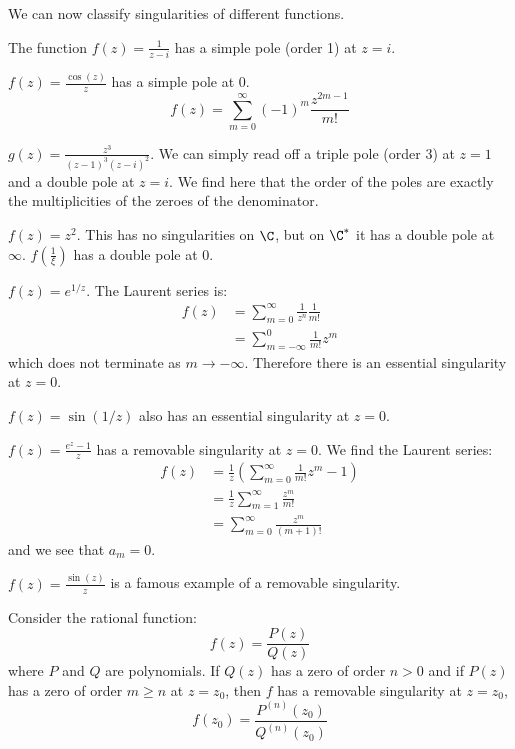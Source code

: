 \documentclass[../Main.tex]{subfiles}
\begin{document}
\begin{examples}{
        We can now classify singularities of different functions.
    }
    \item The function $f(z) = \frac{1}{z-i}$ has a simple pole (order 1) at $z = i$.
    \item $f(z) = \frac{\cos(z)}{z}$ has a simple pole at $0$.
        \begin{equation*}
            f(z) = \sum_{m=0}^{\infty} (-1)^m \frac{z^{2m-1}}{m!}
        \end{equation*}
    \item $g(z) = \frac{z^3}{(z-1)^3(z-i)^2}$. We can simply read off a triple pole (order 3) at $z = 1$ and a double pole at $z = i$. We find here that the order of the poles are exactly the multiplicities of the zeroes of the denominator.
    \item $f(z) = z^2$. This has no singularities on $\C$, but on $\Cstar$ it has a double pole at $\infty$. $f(\frac{1}{\xi})$ has a double pole at $0$.
    \item $f(z) = e^{1 / z}$. The Laurent series is:
        \begin{align*}
            f(z) &= \sum_{m=0}^{\infty} \frac{1}{z^n} \frac{1}{m!} \\
            &= \sum_{m=-\infty}^{0} \frac{1}{m!}z^m
        \end{align*}
        which does not terminate as $m \to -\infty$. Therefore there is an essential singularity at $z = 0$.
    \item $f(z) = \sin(1 / z)$ also has an essential singularity at $z = 0$.
    \item $f(z) = \frac{e^z - 1}{z}$ has a removable singularity at $z = 0$. We find the Laurent series:
        \begin{align*}
            f(z) &= \frac1z \left(\sum_{m=0}^{\infty} \frac{1}{m!} z^m - 1\right) \\
            &= \frac{1}{z} \sum_{m=1}^{\infty} \frac{z^m}{m!} \\
            &= \sum_{m=0}^{\infty} \frac{z^m}{(m+1)!}
        \end{align*}
        and we see that $a_m = 0$.
    \item $f(z) = \frac{\sin(z)}{z}$ is a famous example of a removable singularity.
    \item Consider the rational function:
        \begin{equation*}
            f(z) = \frac{P(z)}{Q(z)}
        \end{equation*}
        where $P$ and $Q$ are polynomials. If $Q(z)$ has a zero of order $n > 0$ and if $P(z)$ has a zero of order $m \geq n$ at $z = z_0$, then $f$ has a removable singularity at $z = z_0$,
        \begin{equation*}
            f(z_0) = \frac{P^{(n)}(z_0)}{Q^{(n)}(z_0)}
        \end{equation*}
\end{examples}
\end{document}
